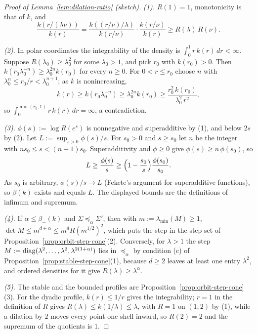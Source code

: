 \begin{proof}[Proof of Lemma~\ref{lem:dilation-ratio} (sketch)]
\emph{(1).} $R(1) = 1$, monotonicity is that of $k$, and
\[
  \frac{k(r/(\lambda\nu))}{k(r)} = \frac{k((r/\nu)/\lambda)}{k(r/\nu)}\cdot\frac{k(r/\nu)}{k(r)}
  \ge R(\lambda)\,R(\nu) .
\]

\emph{(2).} In polar coordinates the integrability of the \Levy{} density is
$\int_0^1r\,k(r)\,dr < \infty$. Suppose $R(\lambda_0) \ge \lambda_0^2$ for some $\lambda_0 > 1$, and pick
$r_0$ with $k(r_0) > 0$. Then $k(r_0\lambda_0^{-n}) \ge \lambda_0^{2n}k(r_0)$ for every $n \ge 0$. For
$0 < r \le r_0$ choose $n$ with $\lambda_0^n \le r_0/r < \lambda_0^{n+1}$; as $k$ is nonincreasing,
\[
  k(r) \ge k(r_0\lambda_0^{-n}) \ge \lambda_0^{2n}k(r_0) \ge \frac{r_0^2\,k(r_0)}{\lambda_0^2\,r^2} ,
\]
so $\int_0^{\min(r_0,1)}r\,k(r)\,dr = \infty$, a contradiction.

\emph{(3).} $\phi(s) := \log R(e^s)$ is nonnegative and superadditive by (1), and below $2s$ by (2). Let
$L := \sup_{s>0}\phi(s)/s$. For $s_0 > 0$ and $s \ge s_0$ let $n$ be the integer with
$ns_0 \le s < (n+1)s_0$. Superadditivity and $\phi \ge 0$ give $\phi(s) \ge n\,\phi(s_0)$, so
\[
  L \ge \frac{\phi(s)}{s} \ge \Bigl(1 - \frac{s_0}{s}\Bigr)\frac{\phi(s_0)}{s_0} .
\]
As $s_0$ is arbitrary, $\phi(s)/s \to L$ (Fekete's argument for superadditive functions), so $\beta(k)$
exists and equals $L$. The displayed bounds are the definitions of infimum and supremum.

\emph{(4).} If $\alpha \le \beta_-(k)$ and $\Sigma \preceq_\alpha \Sigma'$, then with $m := \lambda_{\min}(M)
\ge 1$, $\det M \le m^{d+\alpha} \le m^dR(m^{1/2})^2$, which puts the step in the step set of
Proposition~\ref{prop:orbit-step-cone}(2). Conversely, for $\lambda > 1$ the step
$M := \operatorname{diag}(\lambda^2, \dots, \lambda^2, \lambda^{2(1+\alpha)})$ lies in $\preceq_\alpha$ by condition (c) of
Proposition~\ref{prop:stable-step-cone}(1), because $d \ge 2$ leaves at least one entry $\lambda^2$, and
ordered densities for it give $R(\lambda) \ge \lambda^\alpha$.

\emph{(5).} The stable and the bounded profiles are Proposition~\ref{prop:orbit-step-cone}(3). For the
dyadic profile, $k(r) \le 1/r$ gives the integrability; $r = 1$ in the definition of $R$ gives
$R(\lambda) \le k(1/\lambda) \le \lambda$, with $R = 1$ on $(1, 2)$ by (1), while a dilation by $2$ moves every
point one shell inward, so $R(2) = 2$ and the supremum of the quotients is $1$.
\end{proof}

